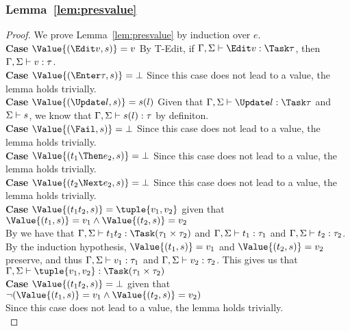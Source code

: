 \subsubsection{Lemma~\ref{lem:presvalue}}
\begin{proof}
  We prove Lemma~\ref{lem:presvalue} by induction over $e$.\\

  \noindent\textbf{Case} $\Value{(\Edit v,s)}=v$ By T-Edit, if
  $\Gamma,\Sigma\infers \Edit v:\Task\tau$, then $\Gamma,\Sigma\vdash v:\tau$.\\

  \noindent\textbf{Case} $\Value{(\Enter \tau,s)}=\bot$ Since this case does not
  lead to a value, the lemma holds trivially.\\

  \noindent\textbf{Case} $\Value{(\Update l,s)}=s(l)$ Given that
  $\Gamma,\Sigma\infers\Update l:\Task \tau$ and $\Sigma\vdash s$, we know that
  $\Gamma,\Sigma\vdash s(l):\tau$ by definiton.\\

  \noindent\textbf{Case} $\Value{(\Fail,s)}=\bot$ Since this case does not lead
  to a value, the lemma holds trivially.\\

  \noindent\textbf{Case} $\Value{(t_1\Then e_2,s)}=\bot$ Since this case does
  not lead to a value, the lemma holds trivially.\\

  \noindent\textbf{Case} $\Value{(t_2\Next e_2,s)}=\bot$ Since this case does
  not lead to a value, the lemma holds trivially.\\

  \noindent\textbf{Case} $\Value{(t_1\And t_2,s)}=\tuple{v_1, v_2}$ given that
  $\Value{(t_1,s)}=v_1\wedge\Value{(t_2,s)}=v_2$\\ By  we have that
  $\Gamma,\Sigma\infers t_1\And t_2:\Task(\tau_1\times\tau_2)$ and
  $\Gamma,\Sigma\vdash t_1:\tau_1$ and $\Gamma,\Sigma\vdash t_2:\tau_2$. By the
  induction hypothesis, $ \Value{(t_1,s)}=v_1$ and $\Value{(t_2,s)}=v_2$ preserve,
  and thus $\Gamma,\Sigma\vdash v_1:\tau_1$ and $\Gamma,\Sigma\vdash v_2:\tau_2$.
  This gives us that $\Gamma,\Sigma\infers \tuple{v_1, v_2}:\Task(\tau_1\times\tau_2)$ \\

  \noindent\textbf{Case} $\Value{(t_1\And t_2,s)}=\bot$ given that
  $\neg(\Value{(t_1,s)}=v_1\wedge\Value{(t_2,s)}=v_2)$\\ Since this case does
  not lead to a value, the lemma holds trivially.\\


\end{proof}
